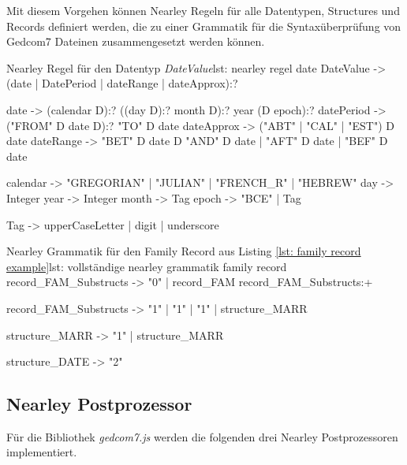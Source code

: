 Mit diesem Vorgehen können Nearley Regeln für alle Datentypen, Structures und Records definiert werden, die zu einer Grammatik für die Syntaxüberprüfung von Gedcom7 Dateinen zusammengesetzt werden können.
\newpage
\vspace{1em}
\begin{javascript}{Nearley Regel für den Datentyp \textit{DateValue}}{lst: nearley regel date}
	DateValue   ->  (date | DatePeriod | dateRange | dateApprox):?
		
	date		->  (calendar  D):?  
					((day  D):?  month  D):?  
					year  
					(D  epoch):?
	datePeriod  ->  ("FROM"  D  date  D):?  "TO"  D  date
	dateApprox  ->  ("ABT" | "CAL" | "EST")  D  date 
	dateRange   ->  "BET"  D  date  D  "AND"  D  date  
					|   "AFT"  D  date  
					|   "BEF"  D  date 
	
	calendar 	->  "GREGORIAN" | "JULIAN" | "FRENCH_R" | "HEBREW"
	day      	->  Integer  
	year 	 	->  Integer
	month    	->  Tag
	epoch    	->  "BCE" | Tag
		
	Tag 		->  upperCaseLetter  |  digit  |  underscore 
\end{javascript}
\vspace{1em}
\newpage
\begin{javascript}{Nearley Grammatik für den Family Record aus Listing \ref{lst: family record example}}{lst: vollständige nearley grammatik family record}
	record_FAM_Substructs
		-> "0"  %
		|  record_FAM  record_FAM_Substructs:+
		
	record_FAM_Substructs 
		-> "1"  %
		|  "1"  %
		|  "1"  %
		|  structure_MARR 
		
	structure_MARR
		-> "1"  %
		|  structure_MARR  
		
	structure_DATE
		-> "2" %
\end{javascript}
\vspace{1em}


\subsection{Nearley Postprozessor}
\label{subsec: Implementierung - Gedcom Grammatik - Nearley Postprozessoren}
Für die Bibliothek \textit{gedcom7.js} werden die folgenden drei Nearley Postprozessoren implementiert.

